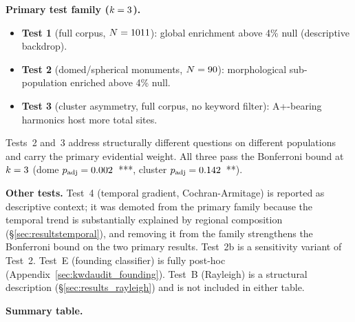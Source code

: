 \documentclass[12pt,a4paper]{article}
\begin{document}
\textbf{Primary test family ($k = 3$).}
\begin{itemize}
  \item \textbf{Test 1} (full corpus, $N = 1011$):
    global enrichment above 4\% null (descriptive backdrop).
  \item \textbf{Test 2} (domed/spherical monuments, $N = 90$):
    morphological sub-population enriched above 4\% null.
  \item \textbf{Test 3} (cluster asymmetry, full corpus, no keyword filter):
    A+-bearing harmonics host more total sites.
\end{itemize}
Tests~2 and~3 address structurally different questions on different
populations and carry the primary evidential weight.
All three pass the Bonferroni bound at $k = 3$
(dome $p_\mathrm{adj} = 0.002$~***,
cluster $p_\mathrm{adj} = 0.142$~**).

\textbf{Other tests.}
Test~4 (temporal gradient, Cochran-Armitage) is reported as descriptive
context; it was demoted from the primary family because the temporal trend
is substantially explained by regional composition
(\S\ref{sec:resultstemporal}), and removing it from the family
strengthens the Bonferroni bound on the two primary results.
Test~2b is a sensitivity variant of Test~2.
Test~E (founding classifier) is fully post-hoc (Appendix~\ref{sec:kwdaudit_founding}).
Test~B (Rayleigh) is a structural description (\S\ref{sec:results_rayleigh})
and is not included in either table.

\textbf{Summary table.}
\end{document}
